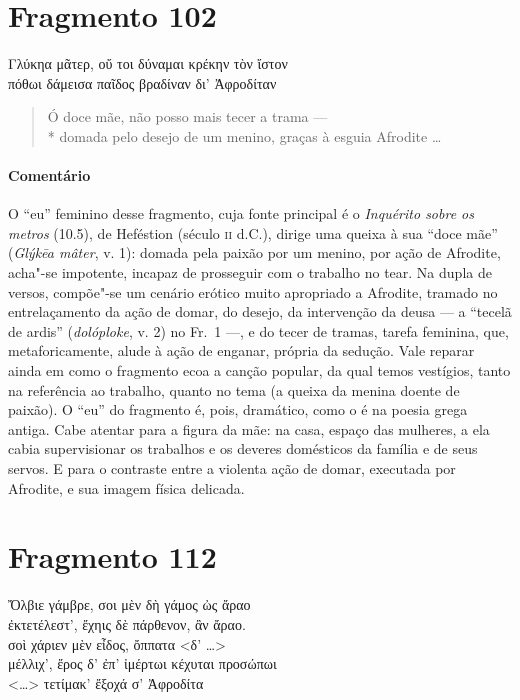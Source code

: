 \pagebreak

\section{Fragmento 102}

\begin{gkverse}
Γλύκηα μᾶτερ, οὔ τοι δύναμαι κρέκην τὸν ἴστον\\
πόθωι δάμεισα παῖδος βραδίναν δι’ Ἀφροδίταν
\end{gkverse}

\begin{verse}
Ó doce mãe, não posso mais tecer a trama --- \\*
domada pelo desejo de um menino, graças à esguia Afrodite \ldots{}
\end{verse}

{\paragraph{Comentário} O “eu” feminino desse fragmento, cuja fonte principal é o \textit{Inquérito
sobre os metros} (10.5), de Heféstion (século \textsc{ii} d.C.), dirige uma queixa à sua
“doce mãe” (\textit{Glýkēa mâter}, v. 1): domada pela paixão por um menino, por ação de Afrodite, acha"-se impotente, incapaz de prosseguir com o trabalho no tear. Na dupla de
versos, compõe"-se um cenário erótico muito apropriado a Afrodite, tramado no
entrelaçamento da ação de domar, do desejo, da intervenção da deusa
--- a ``tecelã de ardis” (\textit{dolóploke}, v. 2) no Fr.~1 ---, e do tecer de tramas, tarefa feminina, que, metaforicamente, alude à ação de enganar, própria da sedução.
Vale reparar ainda em como o fragmento ecoa a canção popular, da qual
temos vestígios, tanto na referência ao trabalho, quanto no tema (a queixa da
menina doente de paixão). O “eu” do fragmento é, pois, dramático, como o é
na poesia grega antiga. Cabe atentar para a figura da mãe: na
casa, espaço das mulheres, a ela cabia supervisionar os trabalhos e os deveres
domésticos da família e de seus servos. E para o contraste entre a violenta
ação de domar, executada por Afrodite, e sua imagem física delicada.}

\pagebreak

\section{Fragmento 112}

\begin{gkverse}
Ὄλβιε γάμβρε, σοι μὲν δὴ γάμος ὠς ἄραο\\
ἐκτετέλεστ’, ἔχηις δὲ πάρθενον, ἂν ἄραο.\\
σοὶ χάριεν μὲν εἶδος, ὄππατα <δ’ \ldots{}>\\
μέλλιχ’, ἔρος δ’ ἐπ’ ἰμέρτωι κέχυται προσώπωι\\
<\ldots{}> τετίμακ’ ἔξοχά σ’ Ἀφροδίτα
\end{gkverse}

